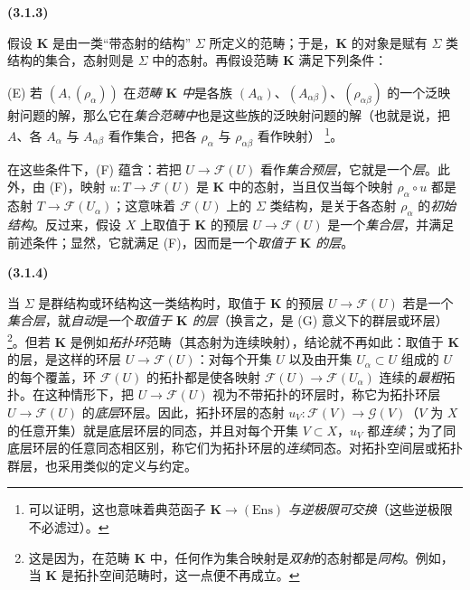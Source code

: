 \documentclass[UTF8,fontset=none,11pt,oneside,openany]{ctexbook}
\newenvironment{env}[1][]{%
  \par\medskip\noindent\textbf{(#1)}\ %
}{\par}
\let\EGAOriginalLabel\label
\renewcommand{\label}[1]{\phantomsection\EGAOriginalLabel{#1}}
\begin{document}
\begin{env}[3.1.3]
\label{0.3.1.3-fr}
假设 $\mathbf{K}$ 是由一类“带态射的结构” $\Sigma$ 所定义的范畴；于是，$\mathbf{K}$ 的对象是赋有 $\Sigma$ 类结构的集合，态射则是 $\Sigma$ 中的态射。再假设范畴 $\mathbf{K}$ 满足下列条件：

\smallskip
\noindent
\textup{(E)} 若 $(A,(\rho_\alpha))$ 在\emph{范畴 $\mathbf{K}$ 中}是各族 $(A_\alpha)$、$(A_{\alpha\beta})$、$(\rho_{\alpha\beta})$ 的一个泛映射问题的解，那么它在\emph{集合范畴中}也是这些族的泛映射问题的解（也就是说，把 $A$、各 $A_\alpha$ 与 $A_{\alpha\beta}$ 看作集合，把各 $\rho_\alpha$ 与 $\rho_{\alpha\beta}$ 看作映射）%
\footnote{可以证明，这也意味着典范函子 $\mathbf{K}\to(\mathrm{Ens})$ \emph{与逆极限可交换}（这些逆极限不必滤过）。}。

在这些条件下，(F) 蕴含：若把 $U\to\mathcal{F}(U)$ 看作\emph{集合预层}，它就是一个\emph{层}。此外，由 (F)，映射 $u:T\to\mathcal{F}(U)$ 是 $\mathbf{K}$ 中的态射，当且仅当每个映射 $\rho_\alpha\circ u$ 都是态射 $T\to\mathcal{F}(U_\alpha)$；这意味着 $\mathcal{F}(U)$ 上的 $\Sigma$ 类结构，是关于各态射 $\rho_\alpha$ 的\emph{初始结构}。反过来，假设 $X$ 上取值于 $\mathbf{K}$ 的预层 $U\to\mathcal{F}(U)$ 是一个\emph{集合层}，并满足前述条件；显然，它就满足 (F)，因而是一个\emph{取值于 $\mathbf{K}$ 的层}。
\end{env}

\begin{env}[3.1.4]
\label{0.3.1.4-fr}
当 $\Sigma$ 是群结构或环结构这一类结构时，取值于 $\mathbf{K}$ 的预层 $U\to\mathcal{F}(U)$ 若是一个\emph{集合层}，就\emph{自动}是一个\emph{取值于 $\mathbf{K}$ 的层}（换言之，是 (G) 意义下的群层或环层）%
\footnote{这是因为，在范畴 $\mathbf{K}$ 中，任何作为集合映射是\emph{双射}的态射都是\emph{同构}。例如，当 $\mathbf{K}$ 是拓扑空间范畴时，这一点便不再成立。}。但若 $\mathbf{K}$ 是例如\emph{拓扑环}范畴（其态射为连续映射），结论就不再如此：取值于 $\mathbf{K}$ 的层，是这样的环层 $U\to\mathcal{F}(U)$：对每个开集 $U$ 以及由开集 $U_\alpha\subset U$ 组成的 $U$ 的每个覆盖，环 $\mathcal{F}(U)$ 的拓扑都是使各映射 $\mathcal{F}(U)\to\mathcal{F}(U_\alpha)$ 连续的\emph{最粗}拓扑。在这种情形下，把 $U\to\mathcal{F}(U)$ 视为不带拓扑的环层时，称它为拓扑环层 $U\to\mathcal{F}(U)$ 的\emph{底层}环层。因此，拓扑环层的态射 $u_V:\mathcal{F}(V)\to\mathcal{G}(V)$（$V$ 为 $X$ 的任意开集）就是底层环层的同态，并且对每个开集 $V\subset X$，$u_V$ 都\emph{连续}；为了同底层环层的任意同态相区别，称它们为拓扑环层的\emph{连续}同态。对拓扑空间层或拓扑群层，也采用类似的定义与约定。
\end{env}
\end{document}
